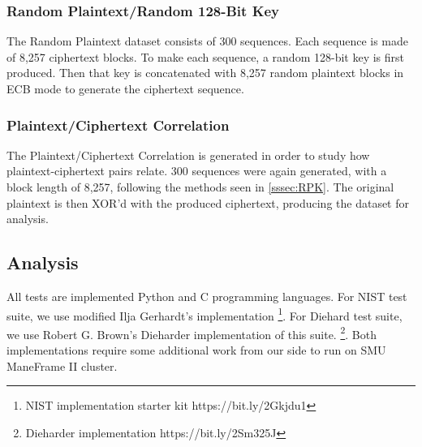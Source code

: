 \documentclass[conference]{IEEEtran}
\begin{document}
\subsubsection{Random Plaintext/Random 128-Bit Key} \label{sssec:RPK}
The Random Plaintext dataset consists of 300 sequences. Each sequence is made of 8,257 ciphertext blocks. To make each sequence, a random 128-bit key is first produced. Then that key is concatenated with 8,257 random plaintext blocks in ECB mode to generate the ciphertext sequence. 
\subsubsection{Plaintext/Ciphertext Correlation}
The Plaintext/Ciphertext Correlation is generated in order to study how plaintext-ciphertext pairs relate. 300 sequences were again generated, with a block length of 8,257, following the methods seen in \autoref{sssec:RPK}. The original plaintext is then XOR'd with the produced ciphertext, producing the dataset for analysis.
	
\subsection{Analysis}

All tests are implemented Python and C programming languages. For NIST test suite, we use modified Ilja Gerhardt's implementation \footnote{NIST implementation starter kit https://bit.ly/2Gkjdu1}. For Diehard test suite, we use Robert G. Brown’s Dieharder implementation of this suite. \footnote{Dieharder implementation https://bit.ly/2Sm325J}. Both implementations require some additional work from our side to run on SMU ManeFrame II cluster. 


\end{document}
